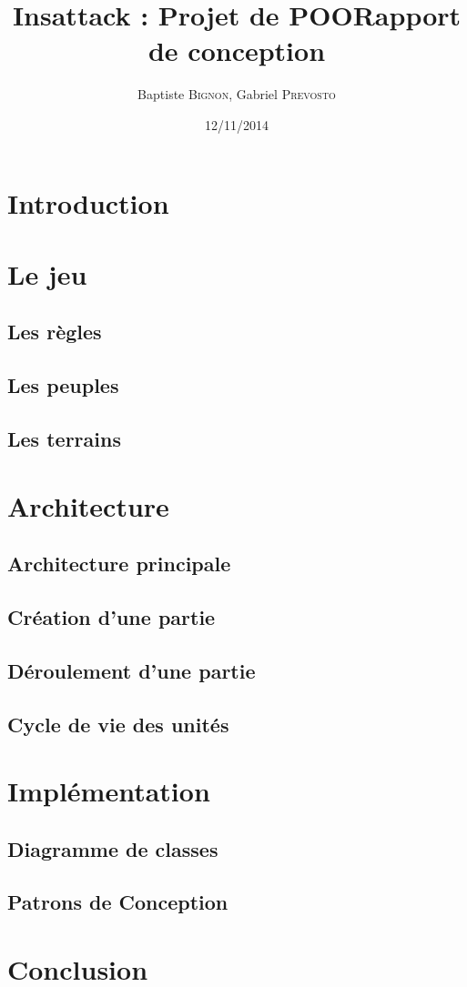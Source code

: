 \documentclass[12pt]{article}
\title{Insattack : Projet de POO\smallbreak Rapport de conception}
\author{Baptiste \textsc{Bignon}, Gabriel \textsc{Prevosto}}
\date{12/11/2014}
\begin{document}
\maketitle
\newpage

\tableofcontents
\renewcommand{\contentsname}{Sommaire}
\newpage


\section{Introduction}
\newpage

\section{Le jeu}
\subsection{Les règles}
\subsection{Les peuples}
\subsection{Les terrains}
\newpage

\section{Architecture}
\subsection{Architecture principale}
\subsection{Création d'une partie}
\subsection{Déroulement d'une partie}
\subsection{Cycle de vie des unités}
\newpage

\section{Implémentation}
\subsection{Diagramme de classes} 
\subsection{Patrons de Conception} 
\newpage

\section{Conclusion}
\end{document}
